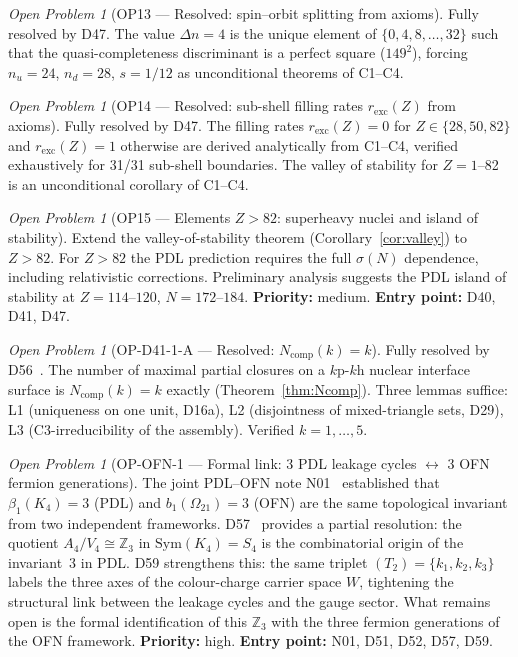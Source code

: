 \documentclass[11pt,a4paper]{article}
\theoremstyle{plain}
\theoremstyle{definition}
\theoremstyle{remark}
\newtheorem{openproblem}[theorem]{Open Problem}
\newcommand{\Kfour}{K_4}
\newcommand{\sigmaN}{\sigma(N)}
\begin{document}
\begin{openproblem}[OP13 --- Resolved: spin--orbit splitting from axioms]
\label{op:spinorbit}
\textcolor{proofblue}{Fully resolved by D47.} The value $\Delta n = 4$ is the unique element of $\{0,4,8,\ldots,32\}$ such that the quasi-completeness discriminant is a perfect square ($149^2$), forcing $n_u=24$, $n_d=28$, $s=1/12$ as unconditional theorems of C1--C4.
\end{openproblem}

\begin{openproblem}[OP14 --- Resolved: sub-shell filling rates $r_{\mathrm{exc}}(Z)$ from axioms]
\label{op:filling}
\textcolor{proofblue}{Fully resolved by D47.} The filling rates $r_{\mathrm{exc}}(Z) = 0$ for $Z \in \{28,50,82\}$ and $r_{\mathrm{exc}}(Z) = 1$ otherwise are derived analytically from C1--C4, verified exhaustively for 31/31 sub-shell boundaries. The valley of stability for $Z=1$--82 is an unconditional corollary of C1--C4.
\end{openproblem}

\begin{openproblem}[OP15 --- Elements $Z>82$: superheavy nuclei and island of stability]
\label{op:superheavy}
Extend the valley-of-stability theorem (Corollary~\ref{cor:valley}) to $Z>82$. For $Z>82$ the PDL prediction requires the full $\sigmaN$ dependence, including relativistic corrections. Preliminary analysis suggests the PDL island of stability at $Z=114$--$120$, $N=172$--$184$. \textbf{Priority:} medium. \textbf{Entry point:} D40, D41, D47.
\end{openproblem}

\begin{openproblem}[OP-D41-1-A --- Resolved: $N_{\mathrm{comp}}(k)=k$]
\label{op:Ncomp}
\textcolor{proofblue}{Fully resolved by D56~\cite{D56}.} The number of maximal partial closures on a $k\mathrm{p}$-$k\mathrm{h}$ nuclear interface surface is $N_{\mathrm{comp}}(k)=k$ exactly (Theorem~\ref{thm:Ncomp}). Three lemmas suffice: L1 (uniqueness on one unit, D16a), L2 (disjointness of mixed-triangle sets, D29), L3 (C3-irreducibility of the assembly). Verified $k=1,\ldots,5$.
\end{openproblem}

\begin{openproblem}[OP-OFN-1 --- Formal link: 3 PDL leakage cycles $\leftrightarrow$ 3 OFN fermion generations]
\label{op:OFN1}
The joint PDL--OFN note N01~\cite{N01} established that $\beta_1(\Kfour)=3$ (PDL) and $b_1(\Omega_{21})=3$ (OFN) are the same topological invariant from two independent frameworks. D57~\cite{D57} provides a partial resolution: the quotient $A_4/V_4 \cong \mathbb{Z}_3$ in $\mathrm{Sym}(\Kfour)=S_4$ is the combinatorial origin of the invariant~3 in PDL. D59 strengthens this: the same triplet $(T_2) = \{k_1,k_2,k_3\}$ labels the three axes of the colour-charge carrier space $W$, tightening the structural link between the leakage cycles and the gauge sector. What remains open is the formal identification of this $\mathbb{Z}_3$ with the three fermion generations of the OFN framework. \textbf{Priority:} high. \textbf{Entry point:} N01, D51, D52, D57, D59.
\end{openproblem}
\end{document}
